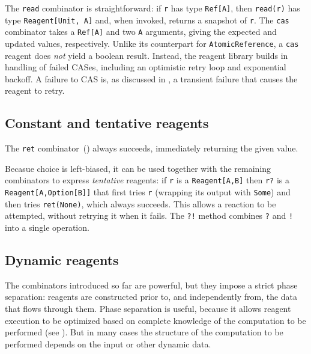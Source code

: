 \documentclass[preprint,nocopyrightspace]{sigplanconf}
\begin{document}
The \lstinline{read} combinator is straightforward: if \lstinline{r}
has type \lstinline{Ref[A]}, then \lstinline{read(r)} has type
\lstinline{Reagent[Unit, A]} and, when invoked, returns a snapshot of
\lstinline{r}.
%
The \lstinline{cas} combinator takes a \lstinline{Ref[A]} and two \lstinline{A}
arguments, giving the expected and updated values, respectively.  Unlike its
counterpart for \lstinline{AtomicReference}, a \lstinline{cas} reagent does
\emph{not} yield a boolean result.  Instead, the reagent library builds in
handling of failed CASes, including an optimistic retry loop and exponential
backoff.  A failure to CAS is, as discussed in , a transient
failure that causes the reagent to retry.

\subsection{Constant and tentative reagents}
\label{sec:failproof}


The \lstinline{ret} combinator~() always succeeds,
immediately returning the given value.

Becasue choice is left-biased, it can be used together with the remaining
combinators to express \emph{tentative} reagents: if \lstinline{r} is a
\lstinline{Reagent[A,B]} then \lstinline{r?} is a
\lstinline{Reagent[A,Option[B]]} that first tries \lstinline{r} (wrapping its
output with \lstinline{Some}) and then tries \lstinline{ret(None)}, which always
succeeds.  This allows a reaction to be attempted, without retrying it when it
fails.  The \lstinline{?!} method combines \lstinline{?} and \lstinline{!} into
a single operation.

\subsection{Dynamic reagents}
\label{sec:dynamic}

The combinators introduced so far are powerful, but they impose a strict phase
separation: reagents are constructed prior to, and independently from, the
data that flows through them.  Phase separation is useful, because it allows
reagent execution to be optimized based on complete knowledge of the
computation to be performed (see ).  But in many cases
the structure of the computation to be performed depends on the input or other
dynamic data.
\end{document}

